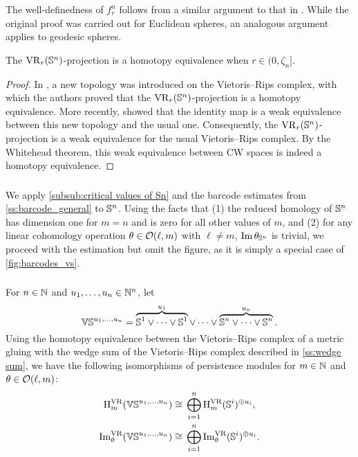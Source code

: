 The well-definedness of $f_r^n$ follows from a similar argument to that in \cite[Lemma 3]{lovasz1983self}.
While the original proof was carried out for Euclidean spheres, an analogous argument applies to geodesic spheres.

\medskip\proposition
The \(\mathrm{VR}_r(\mathbb{S}^n)\)-projection is a homotopy equivalence when $r \in (0, \zeta_n]$.

\begin{proof}
    In \cite{adamaszek2018metric}, a new topology was introduced on the Vietoris--Rips complex, with which the authors proved that the $\mathrm{VR}_r(\mathbb{S}^n)$-projection is a homotopy equivalence.
    More recently, \cite{gillespie2024vietoris} showed that the identity map is a weak equivalence between this new topology and the usual one.
    Consequently, the $\mathrm{VR}_r(\mathbb{S}^n)$-projection is a weak equivalence for the usual Vietoris--Rips complex.
    By the Whitehead theorem, this weak equivalence between CW spaces is indeed a homotopy equivalence.
\end{proof}

\subsubsection{}

\label{subsub:barcode_Sn}

We apply \cref{subsub:critical values of Sn} and the barcode estimates from \cref{ss:barcode_general} to \(\mathbb{S}^n\).
Using the facts that (1) the reduced homology of \(\mathbb{S}^n\) has dimension one for \(m = n\) and is zero for all other values of \(m\), and (2) for any linear cohomology operation \(\theta \in \mathcal{O}(\ell, m)\) with \(\ell \neq m\), \(\operatorname{Im} \theta_{\mathbb{S}^n}\) is trivial, we proceed with the estimation but omit the figure, as it is simply a special case of \cref{fig:barcodes_vs}.

\subsubsection{}

For $n \in \mathbb{N}$ and $u_1, \dots, u_n \in \mathbb{N}^n$, let
\[
\mathbb{VS}^{u_1,\dots,u_n} =
\overbrace{\mathbb{S}^1\vee\dots\vee\mathbb{S}^1}^{u_1} \vee\dots\vee \overbrace{\mathbb{S}^n\vee\dots\vee\mathbb{S}^n}^{u_n}.
\]
Using the homotopy equivalence between the Vietoris--Rips complex of a metric gluing with the wedge sum of the Vietoris--Rips complex described in \cref{ss:wedge sum}, we have the following isomorphisms of persistence modules for \(m \in \mathbb{N}\) and \(\theta \in \mathcal{O}(\ell,m)\):
\[
\begin{split}
	\mathrm{H}_m^{\mathrm{VR}}(\mathbb{VS}^{u_1,\dots,u_n}) &\cong \, \bigoplus_{i=1}^n \mathrm{H}_m^{\mathrm{VR}}(\mathbb{S}^i)^{\oplus u_i}, \\
	\operatorname{Im}_\theta^{\mathrm{VR}}(\mathbb{VS}^{u_1,\dots,u_n}) &\cong \, \bigoplus_{i=1}^n \operatorname{Im}_\theta^{\mathrm{VR}}(\mathbb{S}^i)^{\oplus u_i}.
\end{split}
\]


